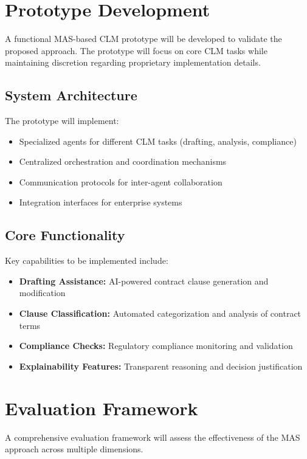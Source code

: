 \section{Prototype Development}

A functional MAS-based CLM prototype will be developed to validate the proposed approach. The prototype will focus on core CLM tasks while maintaining discretion regarding proprietary implementation details.

\subsection{System Architecture}
The prototype will implement:
\begin{itemize}
    \item Specialized agents for different CLM tasks (drafting, analysis, compliance)
    \item Centralized orchestration and coordination mechanisms
    \item Communication protocols for inter-agent collaboration
    \item Integration interfaces for enterprise systems
\end{itemize}

\subsection{Core Functionality}
Key capabilities to be implemented include:
\begin{itemize}
    \item \textbf{Drafting Assistance:} AI-powered contract clause generation and modification
    \item \textbf{Clause Classification:} Automated categorization and analysis of contract terms
    \item \textbf{Compliance Checks:} Regulatory compliance monitoring and validation
    \item \textbf{Explainability Features:} Transparent reasoning and decision justification
\end{itemize}

\section{Evaluation Framework}

A comprehensive evaluation framework will assess the effectiveness of the MAS approach across multiple dimensions.


